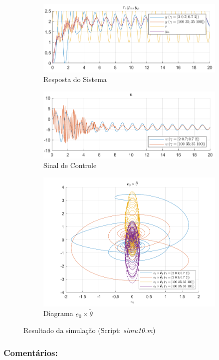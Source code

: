 \documentclass[10pt]{article}
\begin{document}
\begin{figure}[h!]
    \begin{subfigure}[b]{0.45\textwidth}
        \centering
        \includegraphics[width=\textwidth]{img/fig10c.png}
        \caption{Resposta do Sistema}
    \end{subfigure}
    \begin{subfigure}[b]{0.45\textwidth}
        \centering
        \includegraphics[width=\textwidth]{img/fig10e.png}
        \caption{Sinal de Controle}
    \end{subfigure}

    \vspace{0.5cm}

    \begin{subfigure}[b]{0.4\textwidth}
        \centering
        \includegraphics[width=\textwidth]{img/fig10d.png}
        \caption{Diagrama $e_0 \times \tilde{\theta}$}
    \end{subfigure}

    \caption{Resultado da simulação (Script: \textit{simu10.m})}
    \label{fig:sim10}
\end{figure}

\subsubsection{Comentários:}
\end{document}
